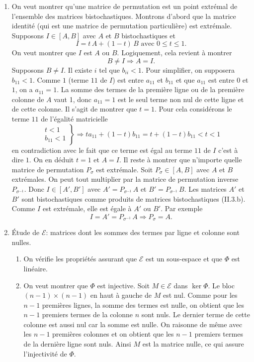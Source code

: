 \begin{enumerate}
 
 \item On veut montrer qu'une matrice de permutation est un point extrémal de l'ensemble des matrices bistochastiques.\newline
Montrons d'abord que la matrice identité (qui est une matrice de permutation particulière) est extrémale. Supposons $I \in \left[ A,B \right]$ avec $A$ et $B$ bistochastiques et 
\[
 I = t\,A + (1-t)\,B \text{ avec } 0 \leq t \leq 1. 
\]
On veut montrer que $I$ est $A$ ou $B$. Logiquement, cela revient à montrer
\[
 B \neq I \Rightarrow A = I.
\]
Supposons $B \neq I$. Il existe $i$ tel que $b_{i i} < 1$. Pour simplifier, on supposera $b_{1 1} < 1$.\newline
Comme $1$ (terme $1 1$ de $I$) est entre $a_{1 1 }$ et $b_{1 1}$ et que $a_{1 1}$ est entre $0$ et $1$, on a  $a_{1 1} = 1$. 
La somme des termes de la première ligne ou de la première colonne de $A$ vaut 1, donc $a_{1 1} = 1$ est le seul terme non nul de cette ligne et de cette colonne.\newline
Il s'agit de montrer que $t=1$. Pour cela considérons le terme $1 1$ de l'égalité matricielle
\[
 \left. 
 \begin{aligned}
  t < 1 \\ b_{1 1} < 1
 \end{aligned}
\right\rbrace \Rightarrow 
t a_{1 1} + (1-t)b_{1 1} = t + (1-t)b_{1 1} < t < 1
\]
en contradiction avec le fait que ce terme est égal au terme $1 1$ de $I$ c'est à dire $1$. On en déduit $t=1$ et $A=I$.\newline
Il reste à montrer que n'importe quelle matrice de permutation $P_\sigma$ est extrémale.\newline
Soit $P_\sigma \in \left[ A, B\right]$ avec $A$ et $B$ extrémales. On peut tout multiplier par la matrice de permutation inverse $P_{\sigma^{-1}}$. Donc $I \in \left[ A', B'\right]$ avec $A' = P_{\sigma^{-1}}\,A$ et $B' = P_{\sigma^{-1}}\,B$. Les matrices $A'$ et $B'$ sont bistochastiques comme produits de matrices bistochastiques (II.3.b). Comme $I$ est extrémale, elle est égale à $A'$ ou $B'$. Par exemple
\[
 I = A' = P_{\sigma^{-1}}\,A \Rightarrow P_\sigma = A.
\]

 \item \'Etude de $\mathcal{E}$: matrices dont les sommes des termes par ligne et colonne sont nulles.
 \begin{enumerate}
  \item On vérifie les propriétés assurant que $\mathcal{E}$ est un sous-espace et que $\Phi$ est linéaire. 
  \item On veut montrer que $\Phi$ est injective. Soit $M \in \mathcal{E}$ dans $\ker \Phi$. Le bloc $(n-1)\times(n-1)$ en haut à gauche de $M$ est nul. Comme pour les $n-1$ premières lignes, la somme des termes est nulle, on obtient que les $n-1$ premiers termes de la colonne $n$ sont nuls. Le dernier terme de cette colonne est aussi nul car la somme est nulle. On raisonne de même avec les $n-1$ premières colonnes et on obtient que les $n-1$ premiers termes de la dernière ligne sont nuls. Ainsi $M$ est la matrice nulle, ce qui assure l'injectivité de $\Phi$.
  

\end{enumerate}
\end{enumerate}
